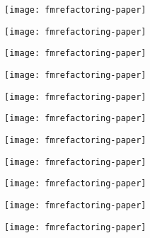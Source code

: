 \documentclass{beamer}
\begin{document}
	\begin{frame}[plain]
		\texttt{[image: fmrefactoring-paper]}
	\end{frame}

	\begin{frame}[plain]
		\texttt{[image: fmrefactoring-paper]}
	\end{frame}

	\begin{frame}[plain]
		\texttt{[image: fmrefactoring-paper]}
	\end{frame}

	\begin{frame}[plain]
		\texttt{[image: fmrefactoring-paper]}
	\end{frame}

	\begin{frame}[plain]
		\texttt{[image: fmrefactoring-paper]}
	\end{frame}

	\begin{frame}[plain]
		\texttt{[image: fmrefactoring-paper]}
	\end{frame}

	\begin{frame}[plain]
		\texttt{[image: fmrefactoring-paper]}
	\end{frame}

	\begin{frame}[plain]
		\texttt{[image: fmrefactoring-paper]}
	\end{frame}

	\begin{frame}[plain]
		\texttt{[image: fmrefactoring-paper]}
	\end{frame}

	\begin{frame}[plain]
		\texttt{[image: fmrefactoring-paper]}
	\end{frame}

	\begin{frame}[plain]
		\texttt{[image: fmrefactoring-paper]}
	\end{frame}
\end{document}
